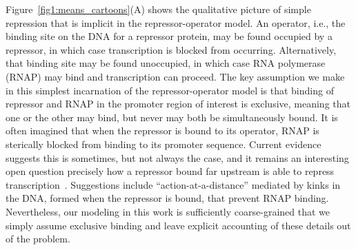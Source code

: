 Figure~\ref{fig1:means_cartoons}(A) shows the qualitative picture of simple
repression that is implicit in the repressor-operator model. An operator, i.e.,
the binding site on the DNA for a repressor protein, may be found occupied by a
repressor, in which case transcription is blocked from occurring. Alternatively,
that binding site may be found unoccupied, in which case RNA polymerase (RNAP)
may bind and transcription can proceed. The key assumption we make in this
simplest incarnation of the repressor-operator model is that binding of
repressor and RNAP in the promoter region of interest is exclusive, meaning that
one or the other may bind, but never may both be simultaneously bound. It is
often imagined that when the repressor is bound to its operator, RNAP is
sterically blocked from binding to its promoter sequence. Current evidence
suggests this is sometimes, but not always the case, and it remains an
interesting open question precisely how a repressor bound far upstream is able
to repress transcription~\cite{Rydenfelt2014-2}. Suggestions include
``action-at-a-distance'' mediated by kinks in the DNA, formed when the repressor
is bound, that prevent RNAP binding. Nevertheless, our modeling in this work is
sufficiently coarse-grained that we simply assume exclusive binding and leave
explicit accounting of these details out of the problem.

